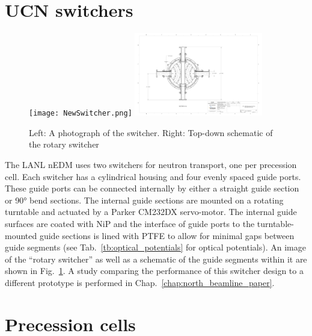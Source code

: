 
\section{UCN switchers}\label{sec:lanl_switchers}


\begin{figure}
    \centering
    \texttt{[image: NewSwitcher.png]}
    \hspace{1em}
    \includegraphics[width=0.5\textwidth]{figures/switcher_schematic.pdf}
    \caption[Photograph and schematic of rotary switcher]{Left: A photograph of the switcher. Right: Top-down schematic of the rotary switcher}\label{fig:NewSwitcher}
\end{figure}

The LANL nEDM uses two switchers for neutron transport, one per precession cell. Each switcher has a cylindrical housing and four evenly spaced guide ports. These guide ports can be connected internally by either a straight guide section or \ang{90} bend sections. The internal guide sections are mounted on a rotating turntable and actuated by a Parker CM232DX servo-motor. The internal guide surfaces are coated with NiP and the interface of guide ports to the turntable-mounted guide sections is lined with PTFE to allow for minimal gaps between guide segments (see Tab.~\ref{tb:optical_potentials} for optical potentials). An image of the ``rotary switcher'' as well as a schematic of the guide segments within it are shown in Fig.~\ref{fig:NewSwitcher}. A study comparing the performance of this switcher design to a different prototype is performed in Chap.~\ref{chap:north_beamline_paper}.


\section{Precession cells}\label{sec:precession_cells}

